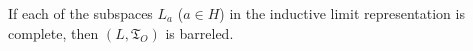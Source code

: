 If each of the subspaces $L_a$ ($a \in H$) in the inductive limit representation is complete, then $(L, \mathfrak{T}_O)$ is barreled.
